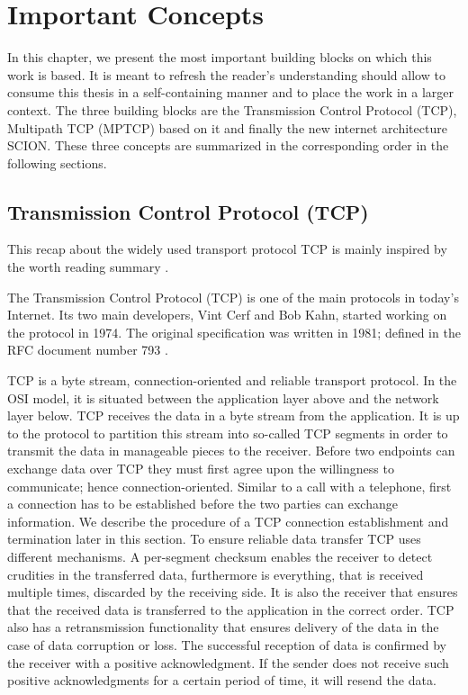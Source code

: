 
\chapter{Important Concepts}
\label{chap:Concepts}
In this chapter, we present the most important building blocks on which this work is based. It is meant to refresh the reader's understanding should allow to consume this thesis in a self-containing manner and to place the work in a larger context. The three building blocks are the Transmission Control Protocol (TCP), Multipath TCP (MPTCP) based on it and finally the new internet architecture SCION. These three concepts are summarized in the corresponding order in the following sections.

\section{Transmission Control Protocol (TCP)}
\label{sec:TCP}

This recap about the widely used transport protocol TCP is mainly inspired by the worth reading summary \cite{TCPSummary}.

The Transmission Control Protocol (TCP) is one of the main protocols in today's Internet. Its two main developers, Vint Cerf and Bob Kahn, started working on the protocol in 1974. The original specification was written in 1981; defined in the RFC document number 793 \cite{rfc793}.

TCP is a byte stream, connection-oriented and reliable transport protocol. In the OSI model, it is situated between the application layer above and the network layer below. TCP receives the data in a byte stream from the application. It is up to the protocol to partition this stream into so-called TCP segments in order to transmit the data in manageable pieces to the receiver. Before two endpoints can exchange data over TCP they must first agree upon the willingness to communicate; hence connection-oriented. Similar to a call with a telephone, first a connection has to be established before the two parties can exchange information. We describe the procedure of a TCP connection establishment and termination later in this section. To ensure reliable data transfer TCP uses different mechanisms. A per-segment checksum enables the receiver to detect crudities in the transferred data, furthermore is everything, that is received multiple times, discarded by the receiving side. It is also the receiver that ensures that the received data is transferred to the application in the correct order. TCP also has a retransmission functionality that ensures delivery of the data in the case of data corruption or loss. The successful reception of data is confirmed by the receiver with a positive acknowledgment. If the sender does not receive such positive acknowledgments for a certain period of time, it will resend the data. 

